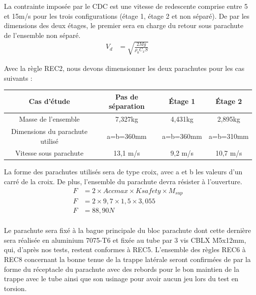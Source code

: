 La contrainte imposée par le \acrshort{CDC} est une vitesse de redescente comprise entre 5 et 15m/s pour les trois
configurations (étage 1, étage 2 et non séparé). De par les dimensions des deux étages, le premier sera en charge du retour
sous parachute de l'ensemble non séparé.
\begin{equation}
\begin{aligned}
    V_d &= \sqrt{\frac{2 M g}{\rho_0 C_x S}} \
\end{aligned}
\end{equation}

Avec la règle REC2, nous devons dimensionner les deux parachutes pour les cas suivants :

\begin{table}[h!]
    \centering
    \begin{tabular}{|c|c|c|c|}
        \hline
        Cas d'étude & Pas de séparation & Étage 1 & Étage 2 \\ \hline
        Masse de l'ensemble & 7,327kg & 4,431kg & 2,895kg \\ \hline
        Dimensions du parachute utilisé & a=b=360mm & a=b=360mm & a=b=310mm \\ \hline
        Vitesse sous parachute & 13,1 m/s & 9,2 m/s & 10,7 m/s \\ \hline
    \end{tabular}
\end{table}

La forme des parachutes utilisés sera de type croix, avec a et b les valeurs d'un carré de la croix. De plus, l'ensemble du
parachute devra résister à l'ouverture.
\begin{equation}
\begin{aligned}
    F &= 2 \times Acc{max} \times K{safety} \times M_{sup} \\
    F &= 2 \times 9,7 \times 1,5 \times 3,055 \\
    F &= 88,90 N \\
\end{aligned}
\end{equation}

Le parachute sera fixé à la bague principale du bloc parachute dont cette dernière sera réalisée en aluminium 7075-T6 et fixée
au tube par 3 vis CBLX M5x12mm, qui, d'après nos tests, restent conformes à REC5. L'ensemble des règles REC6 à REC8 concernant la
bonne tenue de la trappe latérale seront confirmées de par la forme du réceptacle du parachute avec des rebords pour le bon
maintien de la trappe avec le tube ainsi que son usinage pour avoir aucun jeu lors du test en torsion. \\

